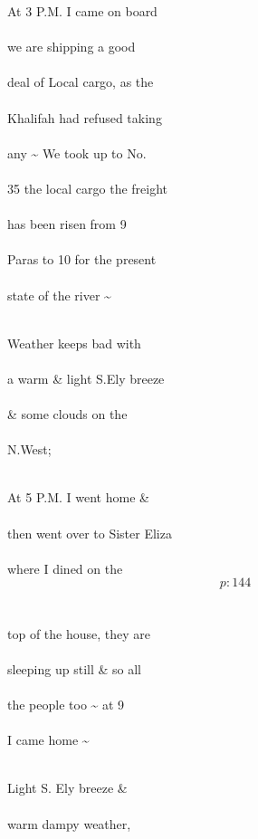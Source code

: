 \documentclass{report}
\begin{document}
	\par{
 	At 3 P.M. I came on board\ \\\ \\we are shipping a good\ \\\ \\deal of Local cargo, as the\ \\\ \\Khalifah had refused taking\ \\\ \\any \~{} We took up to No.\ \\\ \\35 the local cargo the freight\ \\\ \\has been risen from 9\ \\\ \\Paras to 10 for the present\ \\\ \\state of the river \~{}\ \\\ \\
	}

	\par{
 	Weather keeps bad with\ \\\ \\a warm \& light S.Ely breeze\ \\\ \\\& some clouds on the\ \\\ \\N.West;\ \\\ \\
	}

	\par{
 	At 5 P.M. I went home \&\ \\\ \\then went over to Sister Eliza\ \\\ \\where I dined on the\ \\
  \[p: 144 \]
\ \\\ \\top of the house, they are\ \\\ \\sleeping up still \& so all\ \\\ \\the people too \~{} at 9\ \\\ \\I came home \~{}\ \\\ \\
	}

	\par{
 	Light S. Ely breeze \&\ \\\ \\warm dampy weather,\ \\\ \\
	}
\end{document}
